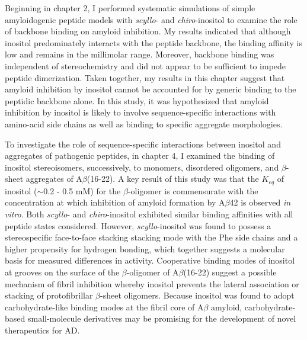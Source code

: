 Beginning in chapter 2, I performed systematic simulations of simple amyloidogenic peptide models with \textit{scyllo}- and \textit{chiro}-inositol to examine the role of backbone binding on amyloid inhibition. My results indicated that although inositol predominately interacts with the peptide backbone, the binding affinity is low and remains in the millimolar range. Moreover, backbone binding was independent of stereochemistry and did not appear to be sufficient to impede peptide dimerization. Taken together, my results in this chapter suggest that amyloid inhibition by inositol cannot be accounted for by generic binding to the peptidic backbone alone. In this study, it was hypothesized that amyloid inhibition by inositol is likely to involve sequence-specific interactions with amino-acid side chains as well as binding to specific aggregate morphologies.

To investigate the role of sequence-specific interactions between inositol and aggregates of pathogenic peptides, in chapter 4, I examined the binding of inositol stereoisomers, successively, to monomers, disordered oligomers, and $\beta$-sheet aggregates of A$\beta$(16-22). A key result of this study was that the $K_{eq}$ of inositol ($\sim$0.2 - 0.5 mM) for the $\beta$-oligomer is commensurate with the concentration at which inhibition of amyloid formation by A$\beta$42 is observed \emph{in vitro}. Both \emph{scyllo}- and \emph{chiro}-inositol exhibited similar binding affinities with all peptide states considered. However,  \textit{scyllo}-inositol was found to possess a stereospecific face-to-face stacking stacking mode with the Phe side chains and a higher propensity for hydrogen bonding, which together suggests a molecular basis for measured differences in activity.  Cooperative binding modes of inositol at grooves on the surface of the $\beta$-oligomer of A$\beta$(16-22) suggest a possible mechanism of fibril inhibition whereby inositol prevents the lateral association or stacking of protofibrillar $\beta$-sheet oligomers. Because inositol was found to adopt carbohydrate-like binding modes at the fibril core of A$\beta$ amyloid, carbohydrate-based small-molecule derivatives may be promising for the development of novel therapeutics for AD.

